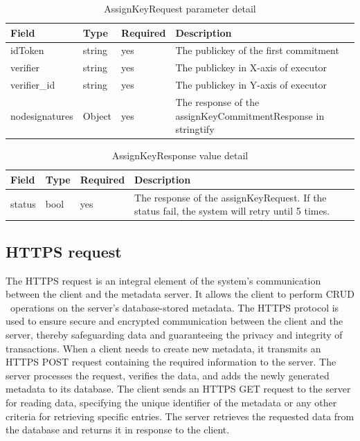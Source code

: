 \documentclass[../Main.tex]{subfiles}
\begin{document}
\begin{table}[H]
  \centering
  \begin{tabular}{|l|l|l|p{8cm}|}
\hline
\rowcolor[HTML]{F56B00} 
\textbf{Field} & \textbf{Type} & \textbf{Required} & \textbf{Description}                    \\ \hline
idToken        & string        & yes               & The publickey of the first commitment   \\ \hline
verifier       & string        & yes               & The publickey in X-axis of executor     \\ \hline
verifier\_id   & string        & yes               & The publickey in Y-axis of executor     \\ \hline
nodesignatures & Object        & yes               & The response of the assignKeyCommitmentResponse in stringtify \\ \hline
\end{tabular}
  \caption{AssignKeyRequest parameter detail}
  \label{assignkeyrequest-params-detail}
\end{table}

\begin{table}[H]
  \centering
  \begin{tabular}{|l|l|l|p{8cm}|}
\hline
\rowcolor[HTML]{F56B00} 
\textbf{Field} & \textbf{Type} & \textbf{Required} & \textbf{Description}                                                                           \\ \hline
status         & bool          & yes               & The response of the assignKeyRequest. If the status fail, the system will retry until 5 times. \\ \hline
\end{tabular}
  \caption{AssignKeyResponse value detail}
  \label{assignkeyreponse-value-detail}
\end{table}
\subsection{HTTPS request}
The HTTPS request is an integral element of the system's communication between the client and the metadata server. It allows the client to perform CRUD  operations on the server's database-stored metadata. The HTTPS protocol is used to ensure secure and encrypted communication between the client and the server, thereby safeguarding data and guaranteeing the privacy and integrity of transactions. When a client needs to create new metadata, it transmits an HTTPS POST request containing the required information to the server. The server processes the request, verifies the data, and adds the newly generated metadata to its database. The client sends an HTTPS GET request to the server for reading data, specifying the unique identifier of the metadata or any other criteria for retrieving specific entries. The server retrieves the requested data from the database and returns it in response to the client.\\
\end{document}
